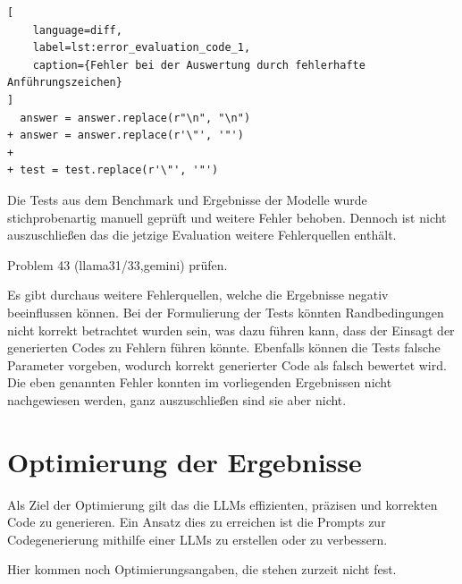 \begin{lstlisting}[
	language=diff,
	label=lst:error_evaluation_code_1,
	caption={Fehler bei der Auswertung durch fehlerhafte Anführungszeichen}
]
  answer = answer.replace(r"\n", "\n")
+ answer = answer.replace(r'\"', '"')
+ 
+ test = test.replace(r'\"', '"') 
\end{lstlisting}

Die Tests aus dem Benchmark und Ergebnisse der Modelle wurde stichprobenartig manuell geprüft und weitere Fehler behoben. Dennoch ist nicht auszuschließen das die jetzige Evaluation weitere Fehlerquellen enthält.\vspace{0.2cm}

Problem 43 (llama31/33,gemini) prüfen.

Es gibt durchaus weitere Fehlerquellen, welche die Ergebnisse negativ beeinflussen können. Bei der Formulierung der Tests könnten Randbedingungen nicht korrekt betrachtet wurden sein, was dazu führen kann, dass der Einsagt der generierten Codes zu Fehlern führen könnte. Ebenfalls können die Tests falsche Parameter vorgeben, wodurch korrekt generierter Code als falsch bewertet wird. Die eben genannten Fehler konnten im vorliegenden Ergebnissen nicht nachgewiesen werden, ganz auszuschließen sind sie aber nicht.



\section{Optimierung der Ergebnisse}
Als Ziel der Optimierung gilt das die LLMs effizienten, präzisen und korrekten Code zu generieren. Ein Ansatz dies zu erreichen ist die Prompts zur Codegenerierung mithilfe einer LLMs zu erstellen oder zu verbessern.

\begin{tcolorbox}[
	enhanced,
	colback=red!5!white,
	colframe=red!75!black!50,
	title= Mein roter Faden
	]
	Hier kommen noch Optimierungsangaben, die stehen zurzeit nicht fest.
\end{tcolorbox}
